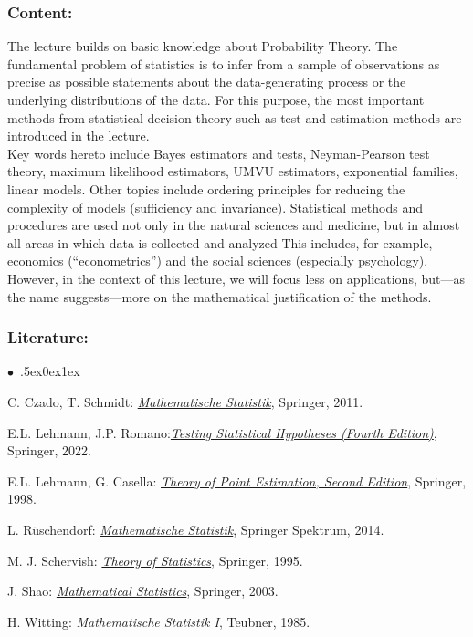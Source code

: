 \documentclass[a4paper,10pt]{article}
\renewenvironment{itemize}{\begin{list}{$\bullet$\ }{\itemsep.5ex\setlength{\topsep}{0.5\itemsep}\parsep0ex\labelsep1ex\settowidth{\labelwidth}{$\bullet$\ }\setlength{\leftmargin}{\labelwidth}\addtolength{\leftmargin}{3ex}\addtolength{\leftmargin}{\labelsep}}}{\end{list}}
\begin{document}
\subsubsection*{\large
    Content:
}
The lecture builds on basic knowledge about Probability Theory. The fundamental problem of statistics is to infer from a sample of observations as precise as possible statements about the data-generating process or the underlying distributions of the data. For this purpose, the most important methods from statistical decision theory such as test and estimation methods are introduced in the lecture. \\ Key words hereto include Bayes estimators and tests, Neyman-Pearson test theory, maximum likelihood estimators, UMVU estimators, exponential families, linear models. Other topics include ordering principles for reducing the complexity of models (sufficiency and invariance). Statistical methods and procedures are used not only in the natural sciences and medicine, but in almost all areas in which data is collected and analyzed This includes, for example, economics (“econometrics”) and the social sciences (especially psychology). However, in the context of this lecture, we will focus less on applications, but---as the name suggests---more on the mathematical justification of the methods.
\subsubsection*{\large
    Literature:
}
\begin{itemize}
\item C. Czado, T. Schmidt: \href{https://link.springer.com/book/10.1007/978-3-642-17261-8}{\emph{Mathematische Statistik}}, Springer, 2011.
\item E.L. Lehmann, J.P. Romano:\href{https://link.springer.com/book/10.1007/978-3-030-70578-7}{\emph{Testing Statistical Hypotheses (Fourth Edition)}}, Springer, 2022.
\item E.L. Lehmann, G. Casella: \href{https://link.springer.com/book/10.1007/b98854}{\emph{Theory of Point Estimation, Second Edition}}, Springer, 1998.  
\item  L. Rüschendorf: \href{https://link.springer.com/book/10.1007/978-3-642-41997-3}{\emph{Mathematische Statistik}}, Springer Spektrum, 2014. 
\item  M. J. Schervish: \href{https://link.springer.com/book/10.1007/978-1-4612-4250-5}{\emph{Theory of Statistics}}, Springer, 1995.
\item J. Shao:  \href{https://link.springer.com/book/10.1007/b97553}{\emph{Mathematical Statistics}}, Springer, 2003. 
\item H. Witting: \emph{Mathematische Statistik I}, Teubner, 1985.
\end{itemize}
\end{document}
